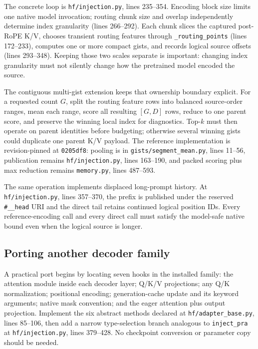 \documentclass[11pt]{article}
\begin{document}
The concrete loop is \texttt{hf/injection.py}, lines 235--354. Encoding block size limits one
native model invocation; routing chunk size and overlap independently determine index
granularity (lines 266--292). Each chunk slices the captured post-RoPE K/V, chooses transient
routing features through \texttt{\_routing\_points} (lines 172--233), computes one or more
compact gists, and records logical source offsets (lines 293--348). Keeping those two
scales separate is important: changing index granularity must not silently change how the
pretrained model encoded the source.

The contiguous multi-gist extension keeps that ownership boundary explicit. For a requested
count $G$, split the routing feature rows into balanced source-order ranges, mean each range,
score all resulting $[G,D]$ rows, reduce to one parent score, and preserve the winning local
index for diagnostics. Top-$k$ must then operate on parent identities before budgeting; otherwise
several winning gists could duplicate one parent K/V payload. The reference implementation is
revision-pinned at \texttt{0205df8}: pooling is in \texttt{gists/segment\_mean.py}, lines 11--56,
publication remains \texttt{hf/injection.py}, lines 163--190, and packed scoring plus max
reduction remains \texttt{memory.py}, lines 487--593.

The same operation implements displaced long-prompt history. At
\texttt{hf/injection.py}, lines 357--370, the prefix is published under the reserved
\texttt{\#\_\_head} URI and the direct tail retains continued logical position IDs. Every
reference-encoding call and every direct call must satisfy the model-safe native bound even
when the logical source is longer.

\subsection{Porting another decoder family}

A practical port begins by locating seven hooks in the installed family: the attention module
inside each decoder layer; Q/K/V projections; any Q/K normalization; positional encoding;
generation-cache update and its keyword arguments; native mask convention; and the eager
attention plus output projection. Implement the six abstract methods declared at
\texttt{hf/adapter\_base.py}, lines 85--106, then add a narrow type-selection branch analogous to
\texttt{inject\_pra} at \texttt{hf/injection.py}, lines 379--428. No checkpoint conversion or
parameter copy should be needed.
\end{document}
